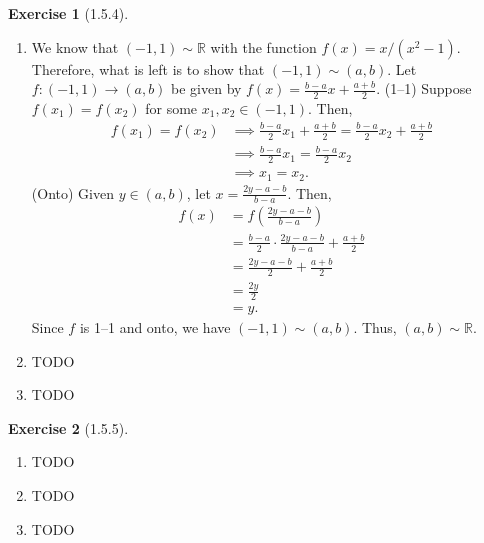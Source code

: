 \documentclass{amsart}
\theoremstyle{definition}
\newtheorem{exercise}{Exercise}
\newcommand{\R}{\mathbb{R}}
\begin{document}
\begin{exercise}[1.5.4]
  \begin{enumerate}[label={(\alph*)}]
    \item We know that $(-1, 1) \sim \R$ with the function $f(x) = x / (x^2 -
      1)$. Therefore, what is left is to show that $(-1, 1) \sim (a, b)$. Let $f
      : (-1, 1) \rightarrow (a, b)$ be given by $f(x) = \frac{b - a}{2} x +
      \frac{a + b}{2}$. (1--1) Suppose $f(x_1) = f(x_2)$ for some $x_1, x_2
      \in (-1, 1)$. Then,
      \begin{align*}
        f(x_1) = f(x_2) &\implies \frac{b - a}{2} x_1 + \frac{a + b}{2} =
        \frac{b - a}{2} x_2 + \frac{a + b}{2} \\
        &\implies \frac{b - a}{2} x_1 = \frac{b - a}{2} x_2 \\
        &\implies x_1 = x_2.
      \end{align*}
      (Onto) Given $y \in (a, b)$, let $x = \frac{2y - a - b}{b - a}$. Then,
      \begin{align*}
        f(x) &= f\left(\frac{2y - a - b}{b - a}\right) \\
        &= \frac{b - a}{2} \cdot \frac{2y - a - b}{b - a} + \frac{a + b}{2} \\
        &= \frac{2y - a - b}{2} + \frac{a + b}{2} \\
        &= \frac{2y}{2} \\
        &= y.
      \end{align*}
      Since $f$ is 1--1 and onto, we have $(-1, 1) \sim (a, b)$. Thus, $(a, b)
      \sim \R$.
    \item TODO
    \item TODO
  \end{enumerate}
\end{exercise}

\begin{exercise}[1.5.5]
  \begin{enumerate}[label={(\alph*)}]
    \item TODO
    \item TODO
    \item TODO
  \end{enumerate}
\end{exercise}
\end{document}
